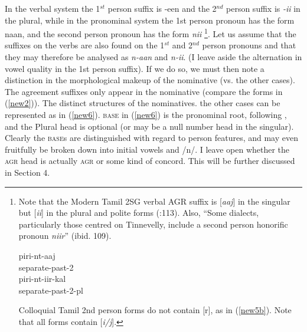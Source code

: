 \documentclass[output=paper,colorlinks,citecolor=brown,
]{langscibook}
\begin{document}
In the verbal system the 1$^{st}$ person suffix is -een and the 2$^{nd}$ person suffix is \textit{-ii} in the plural, while in the pronominal system the 1st person pronoun has the form naan, and the second person pronoun has the form \textit{nii} \footnote{Note that the Modern Tamil 2SG verbal AGR suffix is [\textit{aaj}] in the singular but [\textit{ii}] in the plural and polite forms (\citealt{steever2019dravidian}:113). Also, “Some dialects, particularly those centred on Tinnevelly, include a second person honorific pronoun \textit{niir}” (ibid. 109).


\begin{exe}
\ex \label{newfootnote1a}
\gll piri-nt-aaj \\
separate-past-2 \\

\ex \label{newfootnote1b}
\gll piri-nt-iir-kal \\ 
separate-past-2-pl \\
\end{exe}


Colloquial Tamil 2nd person forms do not contain [r], as in (\ref{new5b}). Note that all forms contain [\textit{i/j}].
}.   Let us assume that the suffixes on the verbs are also found on the 1$^{st}$ and 2$^{nd}$ person pronouns and that they may therefore be analysed as          \textit{n-aan} and \textit{n-ii}. (I leave aside the alternation in vowel quality in the 1st person suffix). If we do so, we must then note a distinction in the morphological makeup of the nominative (vs. the other cases). The agreement suffixes only appear in the nominative (compare the forms in (\ref{new2})). The distinct structures of the nominatives. the other cases can be represented as in (\ref{new6}). \textsc{base} in (\ref{new6}) is the pronominal root, following \citet{SmithBobaljik2019}, and the Plural head is optional (or may be a null number head in the singular). Clearly the \textsc{base}s are distinguished with regard to person features, and may even fruitfully be broken down into initial vowels and /n/. I leave open whether the \textsc{agr} head is actually \textsc{agr} or some kind of concord. This will be further discussed in Section 4.
\end{document}
